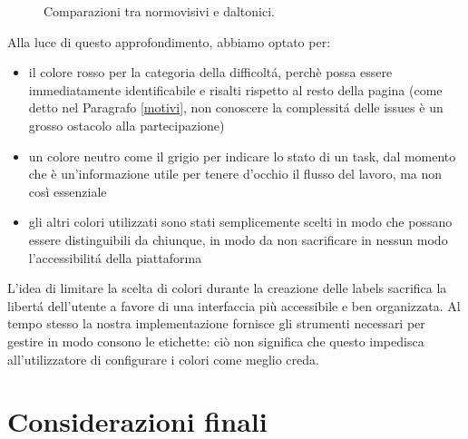 \documentclass[12pt]{article} %
\begin{document}
\begin{figure}[H] 
\caption{Comparazioni tra normovisivi e daltonici.}
\label{fig:daltonici}
\end{figure}

Alla luce di questo approfondimento, abbiamo optato per:
\begin{itemize}
\item il colore rosso per la categoria della difficolt\'a, perch\`e possa essere immediatamente identificabile e risalti rispetto al resto della pagina (come detto nel Paragrafo \ref{motivi}, non conoscere la complessit\'a delle issues \`e un grosso ostacolo alla partecipazione)
\item un colore neutro come il grigio per indicare lo stato di un task, dal momento che \`e un'informazione utile per tenere d'occhio il flusso del lavoro, ma non così essenziale
\item gli altri colori utilizzati sono stati semplicemente scelti in modo che possano essere distinguibili da chiunque, in modo da non sacrificare in nessun modo l'accessibilit\'a della piattaforma 
\end{itemize}
L'idea di limitare la scelta di colori durante la creazione delle labels sacrifica la libert\'a dell'utente a favore di una interfaccia più accessibile e ben organizzata. Al tempo stesso la nostra implementazione fornisce gli strumenti necessari per gestire in modo consono le etichette: ciò non significa che questo impedisca all'utilizzatore di configurare i colori come meglio creda.

\newpage
\section{Considerazioni finali}
\end{document}
